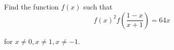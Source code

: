 Find the function $f(x)$ such that\[f(x)^2f\left(\frac{1-x}{x+1}\right) =64x \]

for $x\not=0,x\not=1,x\not=-1$.